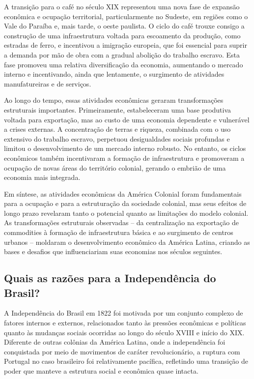 \documentclass[a4paper,12pt]{article}[abntex2]
\begin{document}
A transição para o café no século XIX representou uma nova fase de expansão econômica e ocupação territorial, particularmente no Sudeste, em regiões como o Vale do Paraíba e, mais tarde, o oeste paulista. O ciclo do café trouxe consigo a construção de uma infraestrutura voltada para escoamento da produção, como estradas de ferro, e incentivou a imigração europeia, que foi essencial para suprir a demanda por mão de obra com a gradual abolição do trabalho escravo. Esta fase promoveu uma relativa diversificação da economia, aumentando o mercado interno e incentivando, ainda que lentamente, o surgimento de atividades manufatureiras e de serviços.

Ao longo do tempo, essas atividades econômicas geraram transformações estruturais importantes. Primeiramente, estabeleceram uma base produtiva voltada para exportação, mas ao custo de uma economia dependente e vulnerável a crises externas. A concentração de terras e riqueza, combinada com o uso extensivo do trabalho escravo, perpetuou desigualdades sociais profundas e limitou o desenvolvimento de um mercado interno robusto. No entanto, os ciclos econômicos também incentivaram a formação de infraestrutura e promoveram a ocupação de novas áreas do território colonial, gerando o embrião de uma economia mais integrada.

Em síntese, as atividades econômicas da América Colonial foram fundamentais para a ocupação e para a estruturação da sociedade colonial, mas seus efeitos de longo prazo revelaram tanto o potencial quanto as limitações do modelo colonial. As transformações estruturais observadas – da centralização na exportação de commodities à formação de infraestrutura básica e ao surgimento de centros urbanos – moldaram o desenvolvimento econômico da América Latina, criando as bases e desafios que influenciariam suas economias nos séculos seguintes.

\subsection{\textbf{Quais as razões para a Independência do Brasil?}}

A Independência do Brasil em 1822 foi motivada por um conjunto complexo de fatores internos e externos, relacionados tanto às pressões econômicas e políticas quanto às mudanças sociais ocorridas ao longo do século XVIII e início do XIX. Diferente de outras colônias da América Latina, onde a independência foi conquistada por meio de movimentos de caráter revolucionário, a ruptura com Portugal no caso brasileiro foi relativamente pacífica, refletindo uma transição de poder que manteve a estrutura social e econômica quase intacta.
\end{document}
